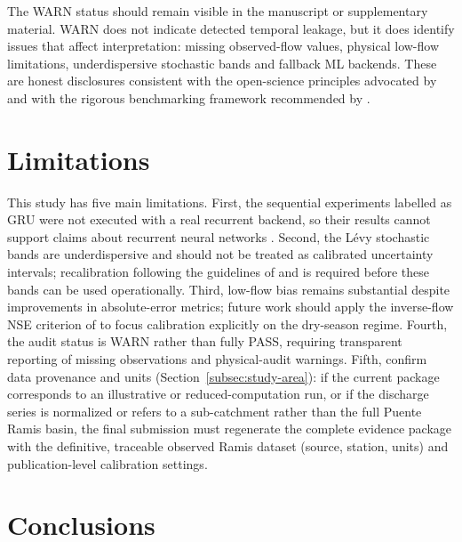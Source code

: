 \documentclass[a4paper,fleqn]{cas-sc}
\begin{document}
The WARN status should remain visible in the manuscript or
supplementary material. WARN does not indicate detected temporal
leakage, but it does identify issues that affect interpretation:
missing observed-flow values, physical low-flow limitations,
underdispersive stochastic bands and fallback ML backends. These are
honest disclosures consistent with the open-science principles
advocated by \citet{hall2021} and with the rigorous benchmarking
framework recommended by \citet{papacharalampous2022}.

\section{Limitations}\label{sec:limitations}

This study has five main limitations. First, the sequential experiments
labelled as GRU were not executed with a real recurrent backend, so
their results cannot support claims about recurrent neural networks
\citep{kratzert2018}. Second, the L\'{e}vy stochastic bands are
underdispersive and should not be treated as calibrated uncertainty
intervals; recalibration following the guidelines of \citet{thiboult2016}
and \citet{abaza2017} is required before these bands can be used
operationally. Third, low-flow bias remains substantial despite
improvements in absolute-error metrics; future work should apply
the inverse-flow NSE criterion of \citet{pushpalatha2012} to focus
calibration explicitly on the dry-season regime. Fourth, the audit
status is WARN rather than fully PASS, requiring transparent reporting
of missing observations and physical-audit warnings. Fifth, %
confirm data provenance and units (Section~\ref{subsec:study-area}):
if the current package corresponds to an illustrative or
reduced-computation run, or if the discharge series is normalized or
refers to a sub-catchment rather than the full Puente Ramis basin, the
final submission must regenerate the complete evidence package with the
definitive, traceable observed Ramis dataset (source, station, units)
and publication-level calibration settings.

\section{Conclusions}\label{sec:conclusions}
\end{document}
